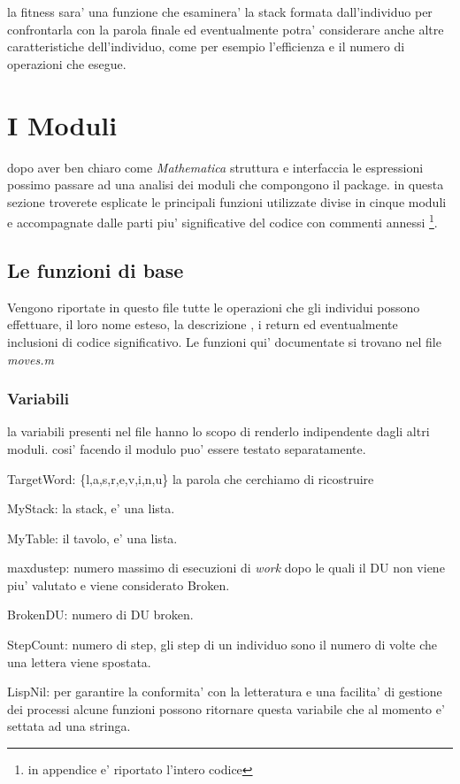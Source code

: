 \documentclass[12pt, a4paper]{article}
\begin{document}
la fitness sara' una funzione che esaminera' la stack formata dall'individuo per confrontarla con la parola finale ed eventualmente potra' considerare anche altre caratteristiche dell'individuo, come per esempio l'efficienza e il numero di operazioni che esegue.


\section{I Moduli}
dopo aver ben chiaro come {\itshape Mathematica} struttura e interfaccia le espressioni possimo passare ad una analisi dei moduli che compongono il package.
in questa sezione troverete esplicate le principali funzioni utilizzate divise in cinque moduli e accompagnate dalle parti piu' significative del codice con commenti annessi
\footnote{in appendice e' riportato l'intero codice}.

\subsection{Le funzioni di base}
Vengono riportate in questo file tutte le operazioni che gli individui possono effettuare, il loro nome esteso, la descrizione , i return ed eventualmente inclusioni di codice significativo. 
Le funzioni qui' documentate si trovano nel file {\itshape moves.m}
\subsubsection{Variabili}
\label{sec:varmoves}
la variabili presenti nel file hanno lo scopo di renderlo indipendente dagli altri moduli. cosi' facendo il modulo puo' essere testato separatamente.
\begin{description}
	\item{TargetWord:} \{l,a,s,r,e,v,i,n,u\} la parola che cerchiamo di ricostruire 
	\item{MyStack:} la stack, e' una lista.
	\item{MyTable:} il tavolo, e' una lista.
	\item{maxdustep:} numero massimo di esecuzioni di {\itshape work} dopo le quali il DU non viene piu' valutato e viene considerato Broken.
	\item{BrokenDU:} numero di DU broken.
	\item{StepCount:} numero di step, gli step di un individuo sono il numero di volte che una lettera viene spostata.
	\item{LispNil:} per garantire la conformita' con la letteratura\cite{mitchell} e una facilita' di gestione dei processi alcune funzioni possono ritornare questa variabile che al momento e' settata ad una stringa.
\end{description}
\end{document}
